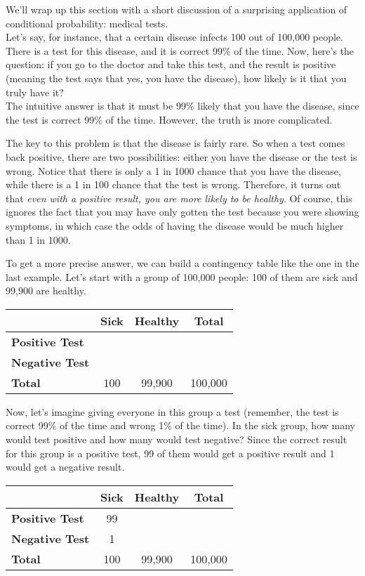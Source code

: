 We'll wrap up this section with a short discussion of a surprising application of conditional probability: medical tests.\\

Let's say, for instance, that a certain disease infects 100 out of 100,000 people.  There is a test for this disease, and it is correct 99\% of the time.  Now, here's the question: if you go to the doctor and take this test, and the result is positive (meaning the test says that yes, you have the disease), how likely is it that you truly have it?\\

The intuitive answer is that it must be 99\% likely that you have the disease, since the test is correct 99\% of the time.  However, the truth is more complicated.

The key to this problem is that the disease is fairly rare.  So when a test comes back positive, there are two possibilities: either you have the disease or the test is wrong.  Notice that there is only a 1 in 1000 chance that you have the disease, while there is a 1 in 100 chance that the test is wrong.  Therefore, it turns out that \emph{even with a positive result, you are more likely to be healthy}.  Of course, this ignores the fact that you may have only gotten the test because you were showing symptoms, in which case the odds of having the disease would be much higher than 1 in 1000.

To get a more precise answer, we can build a contingency table like the one in the last example.  Let's start with a group of 100,000 people: 100 of them are sick and 99,900 are healthy.
\begin{center}
\begin{tabular}{l | c c | c}
& \textbf{Sick} & \textbf{Healthy} & \textbf{Total}\\ \hline
\textbf{Positive Test} & & & \\
\textbf{Negative Test} & & & \\ \hline
\textbf{Total} & 100 & 99,900 & 100,000
\end{tabular}
\end{center}
\pagebreak

Now, let's imagine giving everyone in this group a test (remember, the test is correct 99\% of the time and wrong 1\% of the time).  In the sick group, how many would test positive and how many would test negative?  Since the correct result for this group is a positive test, 99 of them would get a positive result and 1 would get a negative result.
\begin{center}
\begin{tabular}{l | c c | c}
& \textbf{Sick} & \textbf{Healthy} & \textbf{Total}\\ \hline
\textbf{Positive Test} & 99 & & \\
\textbf{Negative Test} & 1 & & \\ \hline
\textbf{Total} & 100 & 99,900 & 100,000
\end{tabular}
\end{center}

